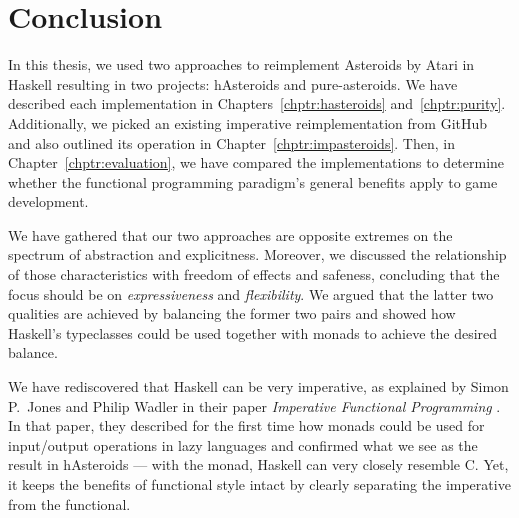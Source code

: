 \documentclass[
  digital, %
  color,   %
  table,   %
  oneside, %
  lof,     %
  lot,     %
]{fithesis3}
\begin{document}
{%





\chapter*{Conclusion}

In this thesis, we used two approaches to reimplement Asteroids by Atari in Haskell
resulting in two projects: hAsteroids and pure-asteroids.
We have described each implementation in Chapters~\ref{chptr:hasteroids} and~\ref{chptr:purity}.
Additionally, we picked an existing imperative reimplementation from GitHub and also
outlined its operation in Chapter~\ref{chptr:impasteroids}.
Then, in Chapter~\ref{chptr:evaluation}, we have compared the implementations
to determine whether the functional programming paradigm's
general benefits apply to game development.

We have gathered that our two approaches are opposite extremes on the spectrum
of abstraction and explicitness. Moreover, we discussed the relationship of those
characteristics with freedom of effects and safeness, concluding
that the focus should be on \emph{expressiveness} and \emph{flexibility}.
We argued that the latter two qualities are achieved by balancing the former two pairs
and showed how Haskell's typeclasses could be used together with monads
to achieve the desired balance.

We have rediscovered that Haskell can be very imperative, as explained by Simon P.~Jones
and Philip Wadler in their paper \textit{Imperative Functional Programming} \cite{imperativefp}.
In that paper, they described for the first time how monads could be used for input/output
operations in lazy languages and confirmed what we see as the result in hAsteroids --- with the
 monad, Haskell can very closely resemble C. Yet, it keeps the
benefits of functional style intact by clearly separating the imperative from the functional.

}
\end{document}
